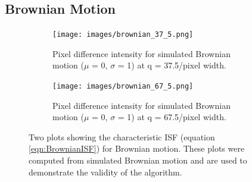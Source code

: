 \documentclass[11pt]{article}
\begin{document}
\subsection{Brownian Motion}
\begin{figure}[H]
\centering
\begin{subfigure}[t]{.47\textwidth}
  \centering
  \texttt{[image: images/brownian\_37\_5.png]}
  \caption{Pixel difference intensity for simulated Brownian motion ($\mu$ = 0, $\sigma$ = 1) at q = 37.5/pixel width.}
  \label{fig:simulated_brownian1_37_5}
\end{subfigure}%
\hfill
\begin{subfigure}[t]{.47\textwidth}
  \centering
  \texttt{[image: images/brownian\_67\_5.png]}
  \caption{Pixel difference intensity for simulated Brownian motion ($\mu$ = 0, $\sigma$ = 1) at q = 67.5/pixel width.}
 \label{fig:simulated_brownian1_67_5}
\end{subfigure}
\caption{Two plots showing the characteristic ISF (equation \ref{eqn:BrownianISF}) for Brownian motion. These plots were computed from simulated Brownian motion and are used to demonstrate the validity of the algorithm.}
\label{fig:simulated_brownian1}
\end{figure}
\end{document}
